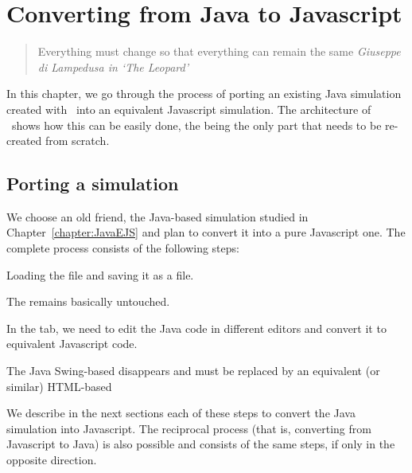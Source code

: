 
\chapter{Converting from Java to Javascript}\label{chapter:JavatoJS}

\begin{quote}
Everything must change so that everything can remain the same  {\em Giuseppe di Lampedusa in `The Leopard'}
\end{quote}

In this chapter, we go through the process of porting an existing Java simulation created with \ejs\ into an equivalent Javascript simulation. The architecture of \ejs\ shows how this can be easily done, the  being the only part that needs to be re-created from scratch. 

    \section{Porting a simulation}\label{section:04Loading}

We choose an old friend, the  Java-based simulation studied in Chapter~\ref{chapter:JavaEJS} and plan to convert it into a pure Javascript one. The complete process consists of the following steps:

\begin{numberlist}

  \item Loading the  file and saving it as a  file.
  \item The  remains basically untouched.
  \item In the  tab, we need to edit the Java code in different editors and convert it to equivalent Javascript code. 
  \item The Java Swing-based  disappears and must be replaced by an equivalent (or similar) HTML-based 
  
\end{numberlist}

We describe in the next sections each of these steps to convert the   Java simulation into Javascript. The reciprocal  process (that is, converting from Javascript to Java) is also possible and consists of the same steps, if only in the opposite direction.


